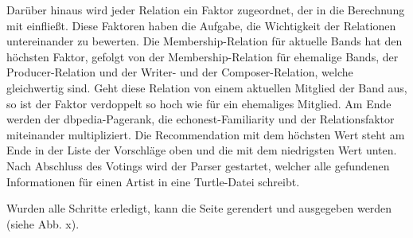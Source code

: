 Darüber hinaus wird jeder Relation ein Faktor zugeordnet, der in die Berechnung mit einfließt. Diese Faktoren haben die Aufgabe, die Wichtigkeit der Relationen untereinander zu bewerten. Die Membership-Relation für aktuelle Bands hat den höchsten Faktor, gefolgt von der Membership-Relation für ehemalige Bands, der Producer-Relation und der Writer- und der Composer-Relation, welche gleichwertig sind. Geht diese Relation von einem aktuellen Mitglied der Band aus, so ist der Faktor verdoppelt so hoch wie für ein ehemaliges Mitglied. Am Ende werden der dbpedia-Pagerank, die echonest-Familiarity und der Relationsfaktor miteinander multipliziert. Die Recommendation mit dem höchsten Wert steht am Ende in der Liste der Vorschläge oben und die mit dem niedrigsten Wert unten.
Nach Abschluss des Votings wird der Parser gestartet, welcher alle gefundenen Informationen für einen Artist in eine Turtle-Datei schreibt.

Wurden alle Schritte erledigt, kann die Seite gerendert und ausgegeben werden (siehe Abb. x).


